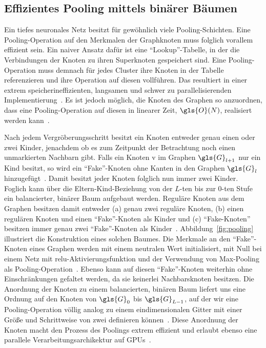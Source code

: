 \subsection{Effizientes Pooling mittels binärer Bäumen}
\label{pooling_mit_baeumen}

Ein tiefes neuronales Netz besitzt für gewöhnlich viele Pooling-Schichten.
Eine Poo\-ling-Operation auf den Merkmalen der Graphknoten muss folglich vorallem effizient sein.
Ein naiver Ansatz dafür ist eine \enquote{Lookup}-Tabelle, in der die Verbindungen der Knoten zu ihren Superknoten gespeichert sind.
Eine Pooling-Operation muss demnach für jedes Cluster ihre Knoten in der Tabelle referenzieren und ihre Operation auf diesen vollführen.
Das resultiert in einer extrem speicherineffizienten, langsamen und schwer zu parallelisierenden Implementierung~\cite{Defferrard}.
Es ist jedoch möglich, die Knoten des Graphen so anzuordnen, dass eine Pooling-Operation auf diesen in linearer Zeit, \dhe{} $\gls{O}\left(N\right)$, realisiert werden kann~\cite{Defferrard}.



Nach jedem Vergröberungsschritt besitzt ein Knoten entweder genau einen oder zwei Kinder, jenachdem ob es zum Zeitpunkt der Betrachtung noch einen unmarkierten Nachbarn gibt.
Falls ein Knoten \gls{v} im Graphen $\gls{G}_{l+1}$ nur ein Kind besitzt, so wird ein \enquote{Fake}-Knoten ohne Kanten in den Graphen $\gls{G}_l$ hinzugefügt~\cite{Defferrard}.
Damit besitzt jeder Knoten folglich nun immer zwei Kinder.
Foglich kann über die Eltern-Kind-Beziehung von der $L$-ten bis zur $0$-ten Stufe ein balancierter, binärer Baum aufgebaut werden.
Reguläre Knoten aus dem Graphen besitzen damit entweder (a) genau zwei reguläre Knoten, (b) einen regulären Knoten und einen \enquote{Fake}-Knoten als Kinder und (c) \enquote{Fake-Knoten} besitzen immer genau zwei \enquote{Fake}-Knoten als Kinder~\cite{Defferrard}.
Abbildung~\ref{fig:pooling} illustriert die Konstruktion eines solchen Baumes.
Die Merkmale an den \enquote{Fake}-Knoten eines Graphen werden mit einem neutralen Wert initialisiert, \dhe{} \zB{} mit Null bei einem Netz mit \gls{relu}-Aktivierungsfunktion und der Verwendung von Max-Pooling als Pooling-Operation~\cite{Defferrard}.
Ebenso kann auf diesen \enquote{Fake}-Knoten weiterhin ohne Einschränkungen gefaltet werden, da sie keinerlei Nachbarsknoten besitzen.
Die Anordnung der Knoten zu einem balancierten, binären Baum liefert uns eine Ordnung auf den Knoten von $\gls{G}_0$ bis $\gls{G}_{L-1}$, auf der wir eine Pooling-Operation völlig analog zu einem eindimensionalen Gitter mit einer Größe und Schrittweise von zwei definieren können~\cite{Defferrard}.
Diese Anordnung der Knoten macht den Prozess des Poolings extrem effizient und erlaubt ebenso eine parallele Verarbeitungsarchikektur auf GPUs~\cite{Defferrard}.

